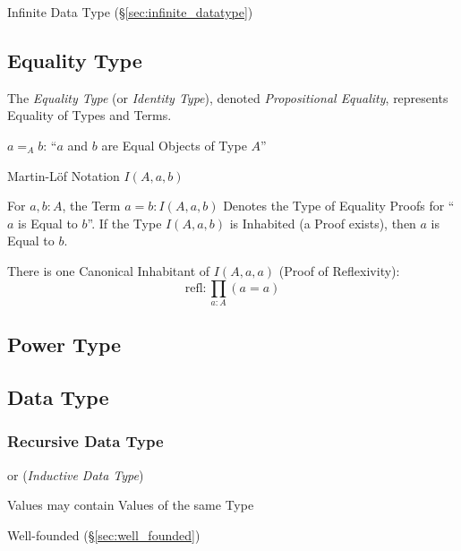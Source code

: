 Infinite Data Type (\S\ref{sec:infinite_datatype})



\subsection{Equality Type}\label{sec:equality_type}

The \emph{Equality Type} (or \emph{Identity Type}), denoted
\emph{Propositional Equality}, represents Equality of Types and Terms.

$a =_A b$: ``$a$ and $b$ are Equal Objects of Type $A$''

Martin-L\"of Notation $I(A,a,b)$

For $a,b:A$, the Term $a = b : I(A,a,b)$ Denotes the Type of Equality
Proofs for ``$a$ is Equal to $b$''. If the Type $I(A,a,b)$ is
Inhabited (a Proof exists), then $a$ is Equal to $b$.

There is one Canonical Inhabitant of $I(A,a,a)$ (Proof of
Reflexivity):
\[
  \text{refl}: \prod_{a:A} (a=a)
\]



\subsection{Power Type}\label{sec:power_type}

\subsection{Data Type}\label{sec:data_type}

\subsubsection{Recursive Data Type}\label{sec:recursive_datatype}

or (\emph{Inductive Data Type})

Values may contain Values of the same Type

Well-founded (\S\ref{sec:well_founded})



